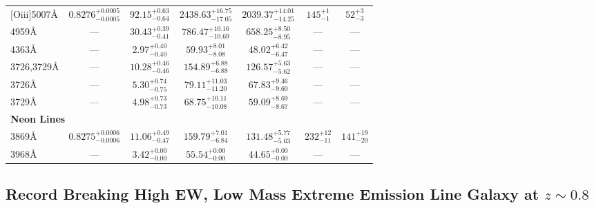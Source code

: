 \documentclass[twocolumn,tight,times,linenumbers]{aastex631}
\newcommand{\oii}{[O{\sc ii}]}
\newcommand{\oiii}{[O{\sc iii}]}
\newcommand{\neiii}{[Ne{\sc iii}]}
\begin{document}
\begin{table}
\begin{tabular*}{\textwidth}{@{\extracolsep{\fill}}lcccccc}
				\oiii5007\AA & $0.8276^{+0.0005}_{-0.0005}$ & $92.15^{+0.63}_{-0.64}$ & $2438.63^{+16.75}_{-17.05}$ & $2039.37^{+14.01}_{-14.25}$ & $145^{+1}_{-1}$ & $52^{+3}_{-3}$ \\
				\oiii4959\AA & --- & $30.43^{+0.39}_{-0.41}$ & $786.47^{+10.16}_{-10.69}$ & $658.25^{+8.50}_{-8.95}$ & --- & --- \\
				\oiii4363\AA & --- & $2.97^{+0.40}_{-0.40}$ & $59.93^{+8.01}_{-8.08}$ & $48.02^{+6.42}_{-6.47}$ & --- & --- \\
				\oii3726,3729\AA & --- & $10.28^{+0.46}_{-0.46}$ & $154.89^{+6.88}_{-6.88}$ & $126.57^{+5.63}_{-5.62}$ & --- & --- \\
				\oii3726\AA & --- & $5.30^{+0.74}_{-0.75}$ & $79.11^{+11.03}_{-11.20}$ & $67.83^{+9.46}_{-9.60}$ & --- & --- \\
				\oii3729\AA & --- & $4.98^{+0.73}_{-0.73}$ & $68.75^{+10.11}_{-10.08}$ & $59.09^{+8.69}_{-8.67}$ & --- & --- \\
				\hline
				\multicolumn{7}{l}{{\textbf{Neon Lines}}}		\\		    	    			    						    		    
				\neiii3869\AA & $0.8275^{+0.0006}_{-0.0006}$ & $11.06^{+0.49}_{-0.47}$ & $159.79^{+7.01}_{-6.84}$ & $131.48^{+5.77}_{-5.63}$ & $232^{+12}_{-11}$ & $141^{+19}_{-20}$ \\
				\neiii3968\AA & --- & $3.42^{+0.00}_{-0.00}$ & $55.54^{+0.00}_{-0.00}$ & $44.65^{+0.00}_{-0.00}$ & --- & --- \\
				\hline
			\end{tabular*}
			\label{table:line_fits}
		\end{table}
		
		
		
		\subsection{Record Breaking High EW, Low Mass Extreme Emission Line Galaxy at $z \sim 0.8$}
		
\end{document}
